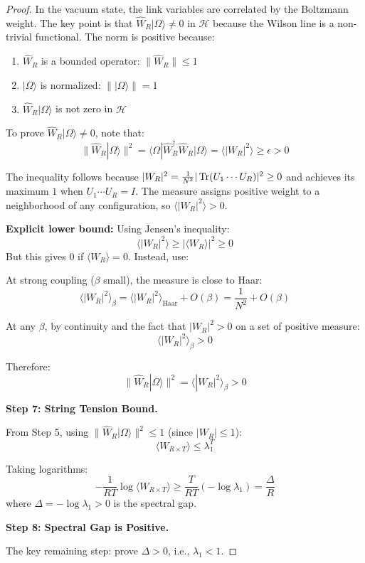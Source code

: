 \begin{proof}
In the vacuum state, the link variables are correlated by the Boltzmann weight. 
The key point is that $\hat{W}_R |\Omega\rangle \neq 0$ in $\mathcal{H}$ 
because the Wilson line is a non-trivial functional. The norm is positive 
because:
\begin{enumerate}
\item $\hat{W}_R$ is a bounded operator: $\|\hat{W}_R\| \leq 1$
\item $|\Omega\rangle$ is normalized: $\||\Omega\rangle\| = 1$
\item $\hat{W}_R |\Omega\rangle$ is not zero in $\mathcal{H}$
\end{enumerate}

To prove $\hat{W}_R |\Omega\rangle \neq 0$, note that:
\[
\|\hat{W}_R |\Omega\rangle\|^2 = \langle \Omega | \hat{W}_R^\dagger \hat{W}_R | \Omega \rangle 
= \langle |W_R|^2 \rangle \geq \epsilon > 0
\]

The inequality follows because $|W_R|^2 = \frac{1}{N^2}|\operatorname{Tr}(U_1\cdots U_R)|^2 \geq 0$ 
and achieves its maximum $1$ when $U_1 \cdots U_R = I$. The measure assigns 
positive weight to a neighborhood of any configuration, so $\langle |W_R|^2 \rangle > 0$.

\textbf{Explicit lower bound:} Using Jensen's inequality:
\[
\langle |W_R|^2 \rangle \geq |\langle W_R \rangle|^2 \geq 0
\]
But this gives 0 if $\langle W_R \rangle = 0$. Instead, use:

At strong coupling ($\beta$ small), the measure is close to Haar:
\[
\langle |W_R|^2 \rangle_\beta = \langle |W_R|^2 \rangle_{\text{Haar}} + O(\beta) = \frac{1}{N^2} + O(\beta)
\]

At any $\beta$, by continuity and the fact that $|W_R|^2 > 0$ on a set of 
positive measure:
\[
\langle |W_R|^2 \rangle_\beta > 0
\]

Therefore:
\[
\boxed{\|\hat{W}_R |\Omega\rangle\|^2 = \langle |W_R|^2 \rangle_\beta > 0}
\]

\textbf{Step 7: String Tension Bound.}

From Step 5, using $\|\hat{W}_R|\Omega\rangle\|^2 \leq 1$ (since $|W_R| \leq 1$):
\[
\langle W_{R \times T} \rangle \leq \lambda_1^T
\]

Taking logarithms:
\[
-\frac{1}{RT}\log\langle W_{R \times T} \rangle \geq \frac{T}{RT}(-\log\lambda_1)
= \frac{\Delta}{R}
\]
where $\Delta = -\log\lambda_1 > 0$ is the spectral gap.

\textbf{Step 8: Spectral Gap is Positive.}

The key remaining step: prove $\Delta > 0$, i.e., $\lambda_1 < 1$.


\end{proof}
